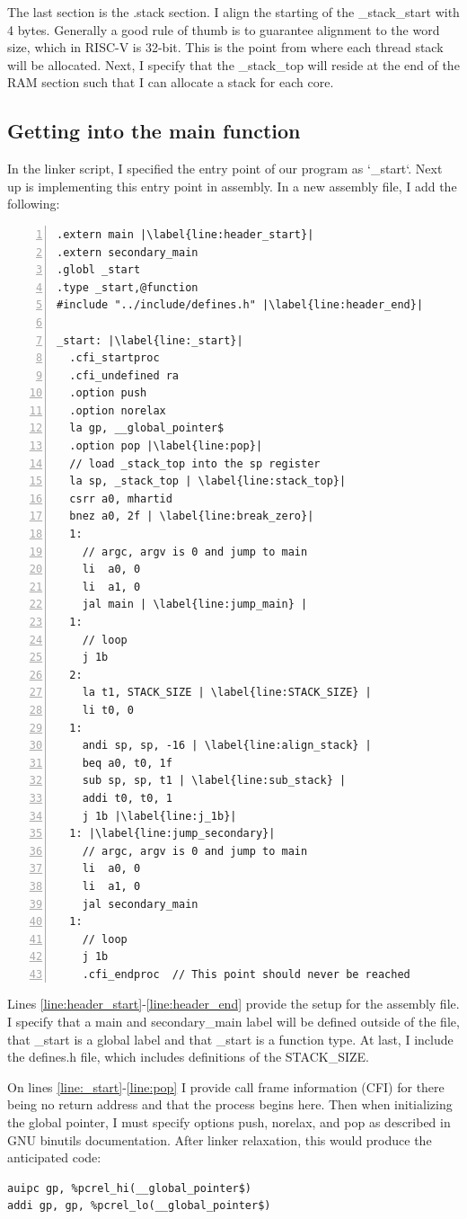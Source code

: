The last section is the .stack section. I align the starting of the
\_stack\_start with 4 bytes. Generally a good rule of thumb is to guarantee
alignment to the word size, which in RISC-V is 32-bit. This is the point from
where each thread stack will be allocated. Next, I specify that the
\_stack\_top will reside at the end of the RAM section such that I can allocate
a stack for each core.

\subsection{Getting into the main function}\label{sec:get_main}
In the linker script, I specified the entry point of our program as `\_start`.
Next up is implementing this entry point in assembly. In a new assembly file, I
add the following:
\begin{lstlisting}[numbers=left, escapechar=|, caption=Assembly code for getting
to main function.]
.extern main |\label{line:header_start}|
.extern secondary_main
.globl _start
.type _start,@function
#include "../include/defines.h" |\label{line:header_end}|

_start: |\label{line:_start}|
  .cfi_startproc
  .cfi_undefined ra
  .option push
  .option norelax
  la gp, __global_pointer$
  .option pop |\label{line:pop}|
  // load _stack_top into the sp register
  la sp, _stack_top | \label{line:stack_top}|
  csrr a0, mhartid
  bnez a0, 2f | \label{line:break_zero}|
  1:
    // argc, argv is 0 and jump to main
    li  a0, 0
    li  a1, 0
    jal main | \label{line:jump_main} |
  1:
    // loop
    j 1b
  2:
    la t1, STACK_SIZE | \label{line:STACK_SIZE} |
    li t0, 0
  1:
    andi sp, sp, -16 | \label{line:align_stack} |
    beq a0, t0, 1f
    sub sp, sp, t1 | \label{line:sub_stack} |
    addi t0, t0, 1
    j 1b |\label{line:j_1b}|
  1: |\label{line:jump_secondary}|
    // argc, argv is 0 and jump to main
    li  a0, 0
    li  a1, 0
    jal secondary_main
  1:
    // loop
    j 1b
    .cfi_endproc  // This point should never be reached
\end{lstlisting}
Lines \ref{line:header_start}-\ref{line:header_end} provide the setup for the
assembly file. I specify that a main and secondary\_main label will be defined
outside of the file, that \_start is a global label and that \_start is a
function type. At last, I include the defines.h file, which includes
definitions of the STACK\_SIZE.

On lines \ref{line:_start}-\ref{line:pop} I provide call frame information
(CFI) for there being no return address and that the process begins here. Then
when initializing the global pointer, I must specify options push, norelax, and
pop as described in GNU binutils documentation\cite{GNU_BIN}. After linker relaxation, this
would produce the anticipated code:
\begin{lstlisting}
auipc gp, %pcrel_hi(__global_pointer$)
addi gp, gp, %pcrel_lo(__global_pointer$)
\end{lstlisting}

